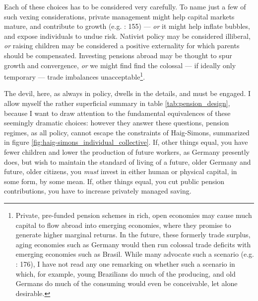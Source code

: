 \documentclass[11pt,a4paper,oneside,openright]{article}
\begin{document}

Each of these choices has to be considered very carefully. 
To name just a few of such vexing considerations, private management might help capital markets mature, and contribute to growth (e.g. \citealt{Barr2005a}: 155) --- \emph{or} it might help inflate bubbles, and expose individuals to undue risk. 
Nativist policy may be considered illiberal, \emph{or} raising children may be considered a positive externality for which parents should be compensated. 
Investing pensions abroad may be thought to spur growth and convergence, \emph{or} we might find find the colossal --- if ideally only temporary --- trade imbalances unacceptable\footnote{
	Private, pre-funded pension schemes in rich, open economies may cause much capital to flow abroad into emerging economies, where they promise to generate higher marginal returns. 
	In the future, these formerly trade surplus, aging economies such as Germany would then run colossal trade deficits with emerging economies such as Brasil. 
	While many advocate such a scenario (e.g. \citealt{Borsch-Supan2003}: 176), I have not read any one remarking on whether such a scenario in which, for example, young Brazilians do much of the producing, and old Germans do much of the consuming would even be conceivable, let alone desirable.}.

The devil, here, as always in policy, dwells in the details, and must be engaged. 
I allow myself the rather superficial summary in table \ref{tab:pension_design}, because I want to draw attention to the fundamental equivalences of these seemingly dramatic choices: 
however they answer these questions, pension regimes, as all policy, cannot escape the constraints of Haig-Simons, summarized in figure \ref{fig:haig-simons_individual_collective}. 
If, other things equal, you have fewer children and lower the production of future workers, as Germany presently does, but wish to maintain the standard of living of a future, older Germany and future, older citizens, you \emph{must} invest in either human or physical capital, in some form, by some mean. 
If,  other things equal, you cut public pension contributions, you have to increase privately managed saving.
\end{document}

